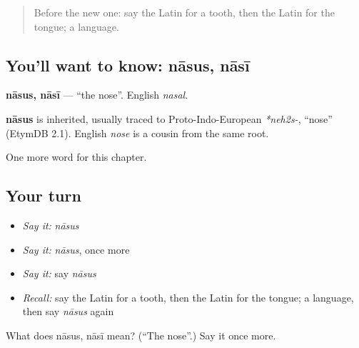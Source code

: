 \label{lesson:LA-C63-nasus}



\begin{quote}
Before the new one: say the Latin for a tooth, then the Latin for the tongue; a language.
\end{quote}

\subsection*{You'll want to know: nāsus, nāsī}
\textbf{nāsus, nāsī} — \textquotedblleft{}the nose\textquotedblright{}. English \emph{nasal}.

\begin{cousinweb}
\textbf{nāsus} is inherited, usually traced to Proto-Indo-European \emph{*neh2s-}, \textquotedblleft{}nose\textquotedblright{} (EtymDB 2.1). English \emph{nose} is a cousin from the same root.
\end{cousinweb}

\begin{grammarlens}[title={What you've built}]
One more word for this chapter.
\end{grammarlens}

\subsection*{Your turn}
\begin{itemize}
\raggedright
  \item \emph{Say it:} \emph{nāsus}
  \item \emph{Say it:} \emph{nāsus}, once more
  \item \emph{Say it:} say \emph{nāsus}
  \item \emph{Recall:} say the Latin for a tooth, then the Latin for the tongue; a language, then say \emph{nāsus} again
\end{itemize}

\begin{tcolorbox}[breakable,colback=teal!4,colframe=teal!35!black,title={Before you move on}]
What does nāsus, nāsī mean? (\textquotedblleft{}The nose\textquotedblright{}.) Say it once more.
\end{tcolorbox}
